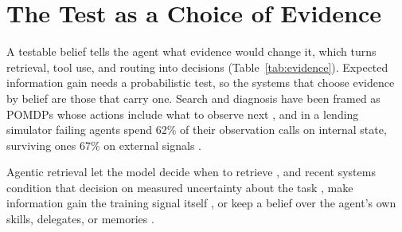 \section{The Test as a Choice of Evidence}
\label{sec:evidence}

A testable belief tells the agent what evidence would change it, which turns retrieval, tool use, and routing into decisions (Table~\ref{tab:evidence}). Expected information gain needs a probabilistic test, so the systems that choose evidence by belief are those that carry one. Search and diagnosis have been framed as POMDPs whose actions include what to observe next \citep{kausik2026context,gao2026medexagent}, and in a lending simulator failing agents spend 62\% of their observation calls on internal state, surviving ones 67\% on external signals \citep{han2026can,zhang2026retailbenchx}.

Agentic retrieval let the model decide when to retrieve \citep{gao2024rag}, and recent systems condition that decision on measured uncertainty about the task \citep{wu2026bayesevolve,zhao2026evoscm,xu2026nesyfs,yan2026denoiseflow,bae2025align,arnould2026cabed,wang2026gavel}, make information gain the training signal itself \citep{liu2026pica,xie2026tips}, or keep a belief over the agent's own skills, delegates, or memories \citep{wu2026bayesian,hosseini2026trainingfree,srivastava2026causal,wu2026reflex}.

